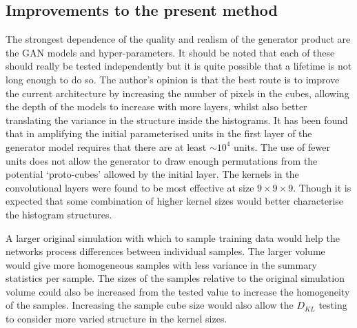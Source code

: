 \documentclass[twocolumn]{article}
\numberwithin{equation}{section}
\begin{document}

\subsection{Improvements to the present method}
The strongest dependence of the quality and realism of the generator product are the GAN models and hyper-parameters. It 
should be noted that each of these should really be tested independently but it is quite possible that a lifetime is not 
long enough to do so. The author's opinion is that the best route is to improve the current architecture by increasing the 
number of pixels in the cubes, allowing the depth of the models to increase with more layers, whilst also better translating
the variance in the structure inside the histograms. It has been found that in amplifying the initial parameterised units 
in the first layer of the generator model requires that there are at least $\sim \! 10^4$ units. The use of
fewer units does not allow the generator to draw enough permutations from the potential `proto-cubes' allowed by the 
initial layer. The kernels in the convolutional layers were found to be most effective at size $9 \times 9 \times 9$. 
Though it is expected that some combination of higher kernel sizes would better characterise the histogram structures. 

A larger original simulation with which to sample training data would help the networks process differences between 
individual samples. The larger volume would give more homogeneous samples with less variance in the summary statistics 
per sample. 
The sizes of the samples relative to the original simulation volume could also be increased from the tested value to
increase the homogeneity of the samples. Increasing the sample cube size would also allow the $D_{KL}$ testing to consider
more varied structure in the kernel sizes. 

\end{document}
